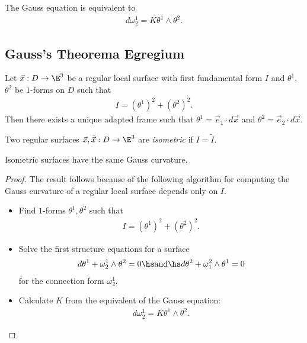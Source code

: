 \documentclass{article}
\begin{document}
\begin{proposition}[Notes 11.6]
	The Gauss equation is equivalent to
	\begin{align*}
		d\omega_2^1 = K\theta^1\wedge\theta^2.
	\end{align*}
\end{proposition}

\subsection{Gauss's Theorema Egregium}

\begin{proposition}[Notes 11.9]
	Let $\vec x:D\to\E^3$ be a regular local surface with first fundamental form
	$I$ and $\theta^1$, $\theta^2$ be $1$-forms on $D$ such that
	\begin{align*}
		I = (\theta^1)^2+(\theta^2)^2.
	\end{align*}
	Then there exists a unique adapted frame such that $\theta^1=\vec e_1\cdot d\vec x$
	and $\theta^2 = \vec e_2 \cdot d\vec x$.
\end{proposition}

\begin{definition}
	Two regular surfaces $\vec x,\tilde{\vec x}:D\to\E^3$ are \emph{isometric}
	if $I=\tilde I$.
\end{definition}

\begin{theorem}
	Isometric surfaces have the same Gauss curvature.
\end{theorem}
\begin{proof}
	The result follows because of the following algorithm for computing the Gauss curvature
	of a regular local surface depends only on $I$.
	\begin{itemize}
		\item Find $1$-forms $\theta^1,\theta^2$ such that \begin{align*}
			      I = (\theta^1)^2 + (\theta^2)^2.
		      \end{align*}
		\item Solve the first structure equations for a surface \begin{align*}
			      d\theta^1 + \omega_2^1 \wedge \theta^2 = 0\hs\text{and}\hs
			      d\theta^2 + \omega_1^2 \wedge \theta^1 = 0
		      \end{align*}
		      for the connection form $\omega_2^1$.
		\item Calculate $K$ from the equivalent of the Gauss equation: \begin{align*}
			      d\omega_2^1 = K\theta^1\wedge\theta^2.
		      \end{align*}
	\end{itemize}
\end{proof}
\end{document}
